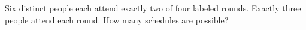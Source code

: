 Six distinct people each attend exactly two of four labeled rounds. Exactly three people attend each round. How many schedules are possible?
